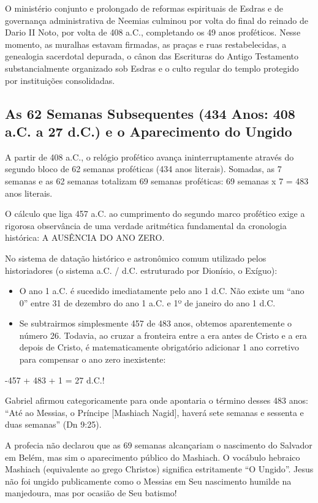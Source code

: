 \documentclass[11pt,a4paper,openany]{book}
\begin{document}
O ministério conjunto e prolongado de reformas espirituais de Esdras e de governança administrativa de Neemias culminou por volta do final do reinado de Dario II Noto, por volta de 408 a.C., completando os 49 anos proféticos. Nesse momento, as muralhas estavam firmadas, as praças e ruas restabelecidas, a genealogia sacerdotal depurada, o cânon das Escrituras do Antigo Testamento substancialmente organizado sob Esdras e o culto regular do templo protegido por instituições consolidadas.



\subsection{As 62 Semanas Subsequentes (434 Anos: 408 a.C. a 27 d.C.) e o Aparecimento do Ungido}


A partir de 408 a.C., o relógio profético avança ininterruptamente através do segundo bloco de 62 semanas proféticas (434 anos literais). Somadas, as 7 semanas e as 62 semanas totalizam 69 semanas proféticas:
69 semanas x 7 = 483 anos literais.

O cálculo que liga 457 a.C. ao cumprimento do segundo marco profético exige a rigorosa observância de uma verdade aritmética fundamental da cronologia histórica: A AUSÊNCIA DO ANO ZERO.

No sistema de datação histórico e astronômico comum utilizado pelos historiadores (o sistema a.C. / d.C. estruturado por Dionísio, o Exíguo):
\begin{itemize}
  \item O ano 1 a.C. é sucedido imediatamente pelo ano 1 d.C. Não existe um ``ano 0'' entre 31 de dezembro do ano 1 a.C. e 1º de janeiro do ano 1 d.C.
  \item Se subtrairmos simplesmente 457 de 483 anos, obtemos aparentemente o número 26. Todavia, ao cruzar a fronteira entre a era antes de Cristo e a era depois de Cristo, é matematicamente obrigatório adicionar 1 ano corretivo para compensar o ano zero inexistente:
\end{itemize}

-457 + 483 + 1 = 27 d.C.!

Gabriel afirmou categoricamente para onde apontaria o término desses 483 anos:
``Até ao Messias, o Príncipe [Mashiach Nagid], haverá sete semanas e sessenta e duas semanas'' (Dn 9:25).

A profecia não declarou que as 69 semanas alcançariam o nascimento do Salvador em Belém, mas sim o aparecimento público do Mashiach. O vocábulo hebraico Mashiach (equivalente ao grego Christos) significa estritamente ``O Ungido''. Jesus não foi ungido publicamente como o Messias em Seu nascimento humilde na manjedoura, mas por ocasião de Seu batismo!
\end{document}
